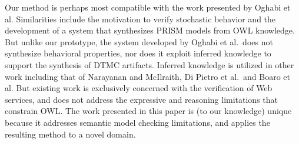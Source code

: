 Our method is perhaps most compatible with the work presented by Oghabi et al. Similarities include the motivation to verify stochastic behavior and the development of a system that synthesizes PRISM models from OWL knowledge. But unlike our prototype, the system developed by Oghabi et al.\ does not synthesize behavioral properties, nor does it exploit inferred knowledge to support the synthesis of DTMC artifacts. Inferred knowledge is utilized in other work including that of Narayanan and McIlraith, Di Pietro et al.\ and Boaro et al. But existing work is exclusively concerned with the verification of Web services, and does not address the expressive and reasoning limitations that constrain OWL\@. The work presented in this paper is (to our knowledge) unique because it addresses semantic model checking limitations, and applies the resulting method to a novel domain.
